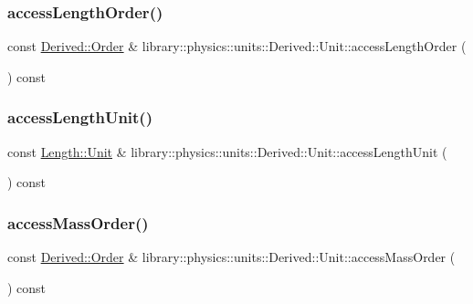 \subsubsection{\texorpdfstring{access\+Length\+Order()}{accessLengthOrder()}}
{\footnotesize\ttfamily const \hyperlink{classlibrary_1_1physics_1_1units_1_1_derived_1_1_order}{Derived\+::\+Order} \& library\+::physics\+::units\+::\+Derived\+::\+Unit\+::access\+Length\+Order (\begin{DoxyParamCaption}{ }\end{DoxyParamCaption}) const}

\mbox{\label{classlibrary_1_1physics_1_1units_1_1_derived_1_1_unit_a39a4cbff8b3e4347a4744e788198ad4d}} 
\subsubsection{\texorpdfstring{access\+Length\+Unit()}{accessLengthUnit()}}
{\footnotesize\ttfamily const \hyperlink{classlibrary_1_1physics_1_1units_1_1_length_a3b8b39cd245cf6b19dc34459baeccb18}{Length\+::\+Unit} \& library\+::physics\+::units\+::\+Derived\+::\+Unit\+::access\+Length\+Unit (\begin{DoxyParamCaption}{ }\end{DoxyParamCaption}) const}

\mbox{\label{classlibrary_1_1physics_1_1units_1_1_derived_1_1_unit_a5ec5da130ffa9412329d1a98a0575dec}} 
\subsubsection{\texorpdfstring{access\+Mass\+Order()}{accessMassOrder()}}
{\footnotesize\ttfamily const \hyperlink{classlibrary_1_1physics_1_1units_1_1_derived_1_1_order}{Derived\+::\+Order} \& library\+::physics\+::units\+::\+Derived\+::\+Unit\+::access\+Mass\+Order (\begin{DoxyParamCaption}{ }\end{DoxyParamCaption}) const}

